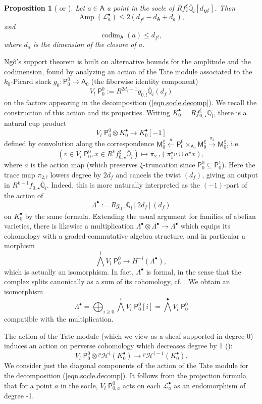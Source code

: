 \documentclass[openany]{amsbook}
\newtheorem{proposition}[theorem]{Proposition}
\theoremstyle{definition}
\theoremstyle{remark}
\numberwithin{equation}{section}
\newcommand{\Q}{\mathbb{Q}}
\newcommand{\cL}{\mathcal{L}}
\newcommand{\ol}[1]{\overline{#1}}
\renewcommand{\-}{\operatorname{-}}
\newcommand{\Amp}{\operatorname{Amp}}
\newcommand{\on}[1]{\operatorname{#1}}
\newcommand{\pHi}{{}^p \mathcal{H}^i}
\newcommand{\pH}{{}^p \mathcal{H}}
\newcommand{\bM}{\mathsf{M}}
\newcommand{\bA}{\mathsf{A}}
\newcommand{\bP}{\mathsf{P}}
\newcommand{\codim}{\on{codim}}
\newcommand{\Tate}{V_l \;}
\begin{document}
\begin{proposition}[{{\cite[Th\'eor\`eme 7.3.1]{ngofl} or \cite[Lemme 10.2.1]{CLII}}}]\label{prop.amp.codim.bound.basic}
    Let $a \in \bA$ a point in the socle of $Rf_\star^\xi \ol{\Q}_l[d_{\bM^\xi}]$. Then 
    $$
        \Amp(\cL_a^\bullet) \le 2(d_{f^\xi} - d_{\bA} + d_a),
    $$
    and
    $$
        \codim_{\bA}(a) \le d_{f^\xi},
    $$
    where $d_a$ is the dimension of the closure of $a$.
\end{proposition}

Ng\^{o}'s support theorem is built on alternative bounds for the amplitude and the codimension, found by analyzing an action of the Tate module associated to the $k_0$-Picard stack $g_0 : \bP_0^0 \to \bA_0$ (the fiberwise identity component)
$$
    \Tate \bP_0^0 := R^{2d_f - 1} g_{0, !} \ol{\Q}_l (d_f)
$$
on the factors appearing in the decomposition (\ref{eqn.socle.decomp}). We recall the construction of this action and its properties. Writing $K^\bullet_0 = R f_{0,\star}^\xi \ol{\Q}_l$, there is a natural cup product
$$
    \Tate \bP_0^0 \otimes K^\bullet_0 \to K^\bullet_0[-1]
$$
defined by convolution along the correspondence $\bM_0^{\xi} \xleftarrow{a} \bP_0^0 \times_{\bA_0} \bM_0^{\xi} \xrightarrow{\pi_2} \bM_0^{\xi}$, i.e.
$$
    (v \in \Tate \bP_0^0, x \in R^k f_{0,\star}^{\xi} \ol{\Q}_l) \mapsto \pi_{2,!}(\pi_1^\star v \cup a^\star x),
$$
where $a$ is the action map (which preserves $\xi$-truncation since $\bP_0^0 \subseteq \bP_0^1$). Here the trace map $\pi_{2,!}$ lowers degree by $2d_f$ and cancels the twist $(d_f)$, giving an output in $R^{k-1} f_{0, \star} \ol{\Q}_l$. Indeed, this is more naturally interpreted as the $(-1)$-part of the action of
$$
    \Lambda^\bullet := R g_{0, !}\ol{\Q}_l[2d_f](d_f)
$$
on $K^\bullet_0$ by the same formula. Extending the usual argument for families of abelian varieties, there is likewise a multiplication $\Lambda^\bullet \otimes \Lambda^\bullet \to \Lambda^\bullet$ which equips its cohomology with a graded-commutative algebra structure, and in particular a morphism
$$
    \bigwedge^i \Tate \bP_0^0 \to H^{-i}(\Lambda^\bullet),
$$
which is actually an isomorphism. In fact, $\Lambda^\bullet$ is formal, in the sense that the complex splits canonically as a sum of its cohomology, cf. \cite[\S 7.4.4]{ngofl}. We obtain an isomorphism
$$
    \Lambda^\bullet = \bigoplus_{i \ge 0} \bigwedge^i \Tate \bP_0^0[i] = \bigwedge^\bullet \Tate \bP_0^0
$$
compatible with the multiplication. 

The action of the Tate module (which we view as a sheaf supported in degree 0) induces an action on perverse cohomology which decreases degree by 1 (\cite[\S 7.4.6]{ngofl}):
$$
    \Tate \bP_0^0 \otimes \pHi(K^\bullet_0) \to  \pH^{i-1}(K^\bullet_0). 
$$
We consider just the diagonal components of the action of the Tate module for the decomposition (\ref{eqn.socle.decomp}). It follows from the projection formula that for a point $a$ in the socle, $\Tate \bP_{0, a}^0$ acts on each $\cL_a^{\bullet}$ as an endomorphism of degree -1.
\end{document}
